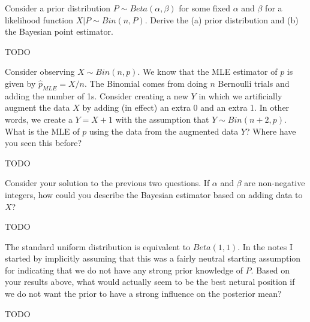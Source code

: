 
Consider a prior distribution $P \sim Beta(\alpha, \beta)$ for some fixed
$\alpha$ and $\beta$ for a likelihood function $X|P \sim Bin(n, P)$. Derive
the (a) prior distribution and (b) the Bayesian point estimator.


TODO


Consider observing $X \sim Bin(n, p)$. We know that the MLE estimator of $p$ is
given by $\hat{p}_{MLE} = X / n$. The Binomial comes from doing $n$ Bernoulli
trials and adding the number of 1s. Consider creating a new $Y$ in which we 
artificially augment the data $X$ by adding (in effect) an extra 0 and an extra
1. In other words, we create a $Y = X + 1$ with the assumption that
$Y \sim Bin(n+2, p)$. What is the MLE of $p$ using the data from the augmented
data $Y$? Where have you seen this before?


TODO


Consider your solution to the previous two questions. If $\alpha$ and $\beta$
are non-negative integers, how could you describe the Bayesian estimator based
on adding data to $X$? 


TODO


The standard uniform distribution is equivalent to $Beta(1,1)$. In the notes
I started by implicitly assuming that this was a fairly neutral starting
assumption for indicating that we do not have any strong prior knowledge of
$P$. Based on your results above, what would actually seem to be the best
netural position if we do not want the prior to have a strong influence on 
the posterior mean?


TODO
